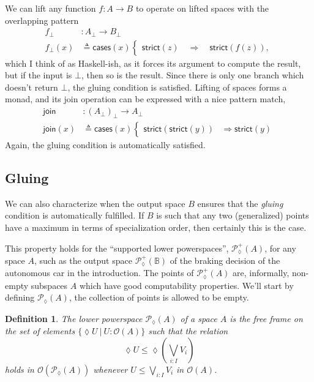 \documentclass[conference]{IEEEtran}
\newtheorem{definition}{Definition}
\newcommand{\PLower}{\mathcal{P}_\lozenge}
\newcommand{\suchthat}{\ |\ }
\newcommand{\Open}[1]{\mathcal{O}({#1})}
\newcommand{\bool}{\mathbb{B}}
\newcommand{\Branch}{\Rightarrow}
\begin{document}
We can lift any function $f : A \to B$ to operate on lifted spaces with the overlapping pattern
\begin{align*}
f_\bot &: A_\bot \to B_\bot
\\ f_\bot(x) &\triangleq
  \mathsf{cases}(x)
  \begin{cases}
  \mathsf{strict}(z) \quad \Branch \quad \mathsf{strict}(f(z)),
  \end{cases}
\end{align*}
which I think of as Haskell-ish, as it forces its argument to compute the result, but if the input is $\bot$, then so is the result. Since there is only one branch which doesn't return $\bot$, the gluing condition is satisfied. Lifting of spaces forms a monad, and its join operation can be expressed with a nice pattern match,
\begin{align*}
\mathsf{join} &: \left( A_\bot \right)_\bot \to A_\bot
\\ \mathsf{join}(x) &\triangleq \mathsf{cases}(x)
\begin{cases}
\mathsf{strict}(\mathsf{strict}(y)) &\Branch \mathsf{strict}(y)
\end{cases}
\end{align*}
Again, the gluing condition is automatically satisfied.

\subsection{Gluing}

We can also characterize when the output space $B$ ensures that the \emph{gluing} condition is automatically fulfilled. If $B$ is such that any two (generalized) points have a maximum in terms of specialization order, then certainly this is the case.

This property holds for the ``supported lower powerspaces'', $\PLower^+(A)$, for any space $A$, such as the output space $\PLower^+(\bool)$ of the braking decision of the autonomous car in the introduction. The points of $\PLower^+(A)$ are, informally, non-empty subspaces $A$ which have good computability properties. We'll start by defining $\PLower(A)$, the collection of points is allowed to be empty.

\begin{definition}
The \emph{lower powerspace} $\PLower(A)$ of a space $A$ is the free frame on the set of elements $\{ \lozenge U \suchthat U : \Open{A} \}$ such that the relation
\[
\lozenge U \le \lozenge \left( \bigvee_{i : I} V_i \right)
\]
holds in $\Open{\PLower(A)}$ whenever $U \le \bigvee_{i : I} V_i$ in $\Open{A}$.
\end{definition}
\end{document}
